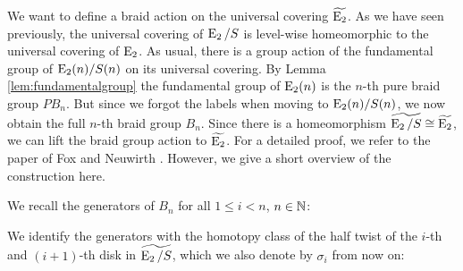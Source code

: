 \begin{const}
We want to define a braid action on the universal covering $\widetilde{\operatorname{E}_2}$.
As we have seen previously, the universal covering of $\operatorname{E}_2 \slash S$ is
level-wise homeomorphic to the universal covering of $\operatorname{E}_2$. As usual, there is
a group action of the fundamental group of $\operatorname{E}_2(n) \slash S(n)$ on its
universal covering. By Lemma \ref{lem:fundamentalgroup} the fundamental group of $\operatorname{E}_2(n)$ is the $n$-th pure braid
group $PB_n$. But since we forgot the labels when moving to $\operatorname{E}_2(n) \slash
S(n)$, we now obtain the full $n$-th braid group $B_n$. Since there is a
homeomorphism $\widetilde{\operatorname{E}_2 \slash S} \cong \widetilde{\operatorname{E}_2}$, we can lift
the braid group action to $\widetilde{\operatorname{E}_2}$. For a detailed proof, we refer to
the paper of Fox and Neuwirth \cite{fox}. However, we give a short overview of
the construction here.

We recall the generators of $B_n$ for all $1 \leq i < n$, $n \in \mathbb{N}$:
\begin{center}
\end{center}

We identify the generators with the homotopy class of the half twist of the
$i$-th and $(i+1)$-th disk in $\widetilde{\operatorname{E}_2 \slash S}$, which we also
denote by $\sigma_i$ from now on:
\begin{center}
\end{center}


\end{const}
